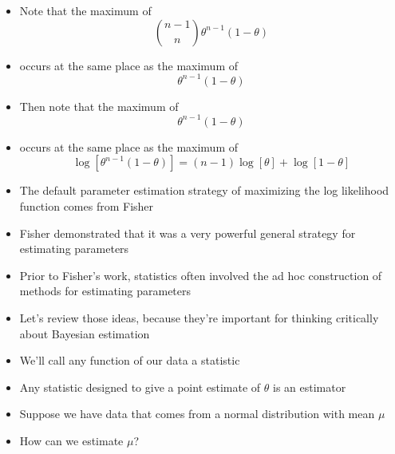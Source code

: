 \documentclass{beamer}
\begin{document}
\frame
{
  \begin{itemize}
    \item{Note that the maximum of}
  \[
  \binom{n - 1}{n} \theta ^ {n - 1} (1 - \theta)
  \]
    \item{occurs at the same place as the maximum of}
  \[
  \theta ^ {n - 1} (1 - \theta)
  \]
  \end{itemize}
}

\frame
{
  \begin{itemize}
    \item{Then note that the maximum of}
  \[
  \theta ^ {n - 1} (1 - \theta)
  \]
    \item{occurs at the same place as the maximum of}
  \[
  \log[\theta ^ {n - 1} (1 - \theta)] = (n -1) \log[\theta] + \log[1 - \theta]
  \]
  \end{itemize}
}

\frame
{
  \begin{itemize}
    \item{The default parameter estimation strategy of maximizing the log likelihood function comes from Fisher}
    \item{Fisher demonstrated that it was a very powerful general strategy for estimating parameters}
  \end{itemize}
}

\frame
{
  \begin{itemize}
    \item{Prior to Fisher's work, statistics often involved the ad hoc construction of methods for estimating parameters}
    \item{Let's review those ideas, because they're important for thinking critically about Bayesian estimation}
  \end{itemize}
}

\frame
{
  \begin{itemize}
    \item{We'll call any function of our data a statistic}
    \item{Any statistic designed to give a point estimate of $\theta$ is an estimator}
  \end{itemize}
}

\frame
{
  \begin{itemize}
    \item{Suppose we have data that comes from a normal distribution with mean $\mu$}
    \item{How can we estimate $\mu$?}
  \end{itemize}
}
\end{document}
